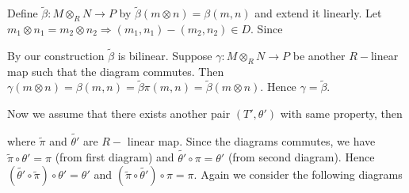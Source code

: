 \documentclass[11pt]{amsart}
\DeclareMathOperator{\id}{\text{id}}
\begin{document}
\proof Define $\tilde{\beta}:M\otimes_RN\to P$ by $\tilde{\beta}(m\otimes n)=\beta(m,n)$ and extend it linearly. Let $m_1\otimes n_1=m_2\otimes n_2 \Rightarrow (m_1,n_1)-(m_2,n_2)\in D.$ Since 

 
 By our construction $\tilde{\beta}$ is bilinear. Suppose $\gamma:M\otimes_RN\to P$ be another $R-$linear map such that the diagram commutes. Then $\gamma(m\otimes n)=\beta(m,n)=\tilde{\beta}\pi(m,n)=\tilde{\beta}(m\otimes n).$ Hence $\gamma=\tilde{\beta}.$
 
Now we assume that there exists another pair $(T',\theta')$ with same property, then

\begin{center}


\end{center}

where $\tilde{\pi}$ and $\tilde{\theta'}$ are $R-$ linear map. Since the diagrams commutes, we have $\tilde{\pi}\circ \theta'=\pi$ (from first diagram) and $\tilde{\theta'}\circ \pi=\theta'$ (from second diagram). Hence $(\tilde{\theta'}\circ \tilde{\pi})\circ \theta'=\theta'$ and $(\tilde{\pi}\circ\tilde{\theta'})\circ \pi=\pi.$ Again we consider the following diagrams 

\begin{center}


\end{center}
\end{document}
